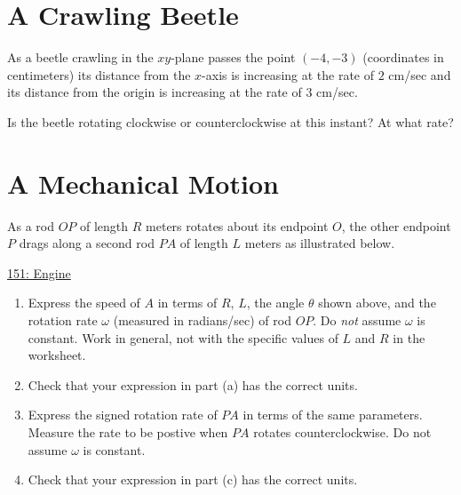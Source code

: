 \documentclass{ximera}
\begin{document}
\section{A Crawling Beetle}
\begin{question}  \label{Qbnmkgytyuu}
As a beetle crawling in the $xy$-plane passes the point $(-4,-3)$ (coordinates in centimeters) its distance from the $x$-axis is increasing at the rate of $2$ cm/sec and its distance from the origin is increasing at the rate of $3$ cm/sec.

Is the beetle rotating clockwise or counterclockwise at this instant? At what rate?

\end{question}

\section{A Mechanical Motion}
\begin{question}  \label{Q34fdffffhggg}
As a rod $OP$ of length $R$ meters rotates about its endpoint $O$, the other endpoint $P$ drags along a second rod $PA$ of length $L$ meters as illustrated below.

 
\begin{onlineOnly}
   \begin{center}
\end{center}
\end{onlineOnly}

\href{https://www.desmos.com/calculator/l03dlyifb0}{151: Engine}

\begin{enumerate}
\item Express the speed of $A$ in terms of $R$, $L$, the angle $\theta$ shown above, and the rotation rate $\omega$ (measured in radians/sec) of rod $OP$. Do \emph{not} assume $\omega$ is constant. Work in general, not with the specific values of $L$ and $R$ in the worksheet.

\item Check that your expression in  part (a) has the correct units.

\item Express the signed rotation rate of $PA$ in terms of the same parameters. Measure the rate to be postive when $PA$ rotates counterclockwise. Do not assume $\omega$ is constant.

\item Check that your expression in  part (c) has the correct units.
\end{enumerate}

\end{question}
\end{document}
